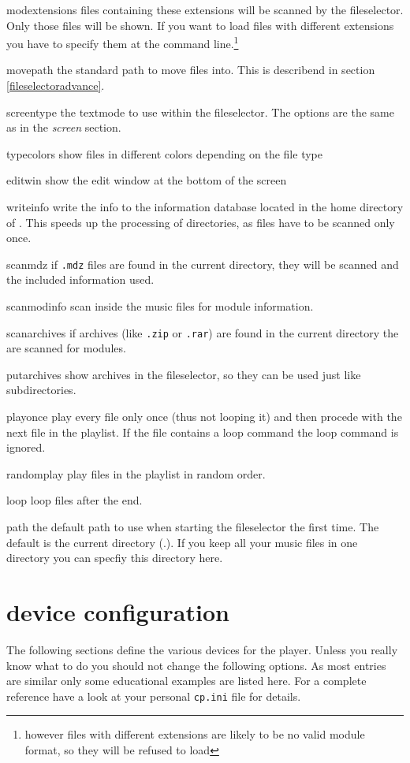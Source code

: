 \begin{dojlist}
\item[modextensions] files containing these extensions will be scanned by the
fileselector. Only those files will be shown. If you want to load
files with different extensions you have to specify them at the
command line.\footnote{however files with different extensions are
likely to be no valid module format, so they will be refused to load}
\item[movepath] the standard path to move files into. This is describend in
section \ref{fileselectoradvance}.
\item[screentype] the textmode to use within the fileselector. The options are
the same as in the \emph{screen} section.
\item[typecolors] show files in different colors depending on the file type
\item[editwin] show the edit window at the bottom of the screen
\item[writeinfo] write the info to the information database located in the
home directory of \cp. This speeds up the processing of directories,
as files have to be scanned only once.
\item[scanmdz] if \texttt{.mdz} files are found in the current directory, they
will be scanned and the included information used.
\item[scanmodinfo] scan inside the music files for module information.
\item[scanarchives] if archives (like \texttt{.zip} or \texttt{.rar}) are
found in the current directory the are scanned for modules.
\item[putarchives] show archives in the fileselector, so they can be used just
like subdirectories.
\item[playonce] play every file only once (thus not looping it) and then 
procede with the next file in the playlist. If the file contains a
loop command the loop command is ignored.
\item[randomplay] play files in the playlist in random order.
\item[loop] loop files after the end.
\item[path] the default path to use when starting the fileselector the first
time. The default is the current directory (.). If you keep all your
music files in one directory you can specfiy this directory here.
\end{dojlist}

\section{device configuration}
The following sections define the various devices for the
player. Unless you really know what to do you should not change the
following options. As most entries are similar only some educational
examples are listed here. For a complete reference have a look at your
personal \texttt{cp.ini} file for details.

